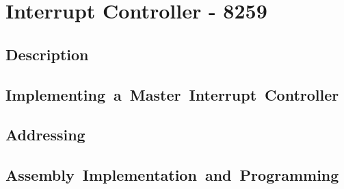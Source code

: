 \section{Interrupt Controller - 8259}

    \subsection{Description}

    \subsection{Implementing a Master Interrupt Controller}

    \subsection{Addressing}

    \subsection{Assembly Implementation and Programming}
